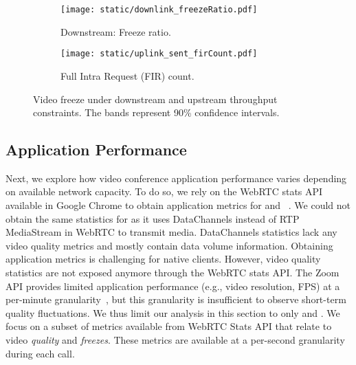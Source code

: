 \begin{figure}[t]
    \centering
    \begin{subfigure}[t]{0.4\textwidth}      
        \texttt{[image: static/downlink\_freezeRatio.pdf]}
        \caption{Downstream: Freeze ratio.}
 		\label{subfig:downlink_freeze_ratio}
    \end{subfigure}
	\begin{subfigure}[t]{0.4\textwidth}   
        \centering
        \texttt{[image: static/uplink\_sent\_firCount.pdf]}
    \caption{Full Intra Request (FIR) count.}
    \label{subfig:uplink_fir}
    \end{subfigure}%
	\caption{Video freeze under downstream and upstream throughput constraints. The bands represent 90\% confidence intervals.%
	}
	\label{fig:video_freeze}
\end{figure}







\subsection{Application Performance}
\label{subsec:application_performance}

Next, we explore how video conference application performance varies depending
on available network capacity.  To do so, we rely on the WebRTC stats API
available in Google Chrome to obtain application metrics for \teamsbrowser and
\meet~\cite{webrtc_stats}. We could not obtain the same statistics for
\zoombrowser as it uses DataChannels instead of RTP MediaStream in WebRTC to
transmit media. DataChannels statistics lack any video quality metrics and
mostly contain data volume information. Obtaining application metrics is
challenging for native clients.  However, video quality statistics are not
exposed anymore through the WebRTC stats API. The Zoom API provides limited
application performance (e.g., video resolution, FPS) at a per-minute
granularity~\cite{zoom_qos_api}, but this granularity is insufficient to
observe short-term quality fluctuations.  We thus limit our analysis in this
section to only \meet and \teamsbrowser. We focus on a subset of metrics
available from WebRTC Stats API that relate to video \textit{quality} and
\textit{freezes}. These metrics are available at a per-second granularity
during each call. 

